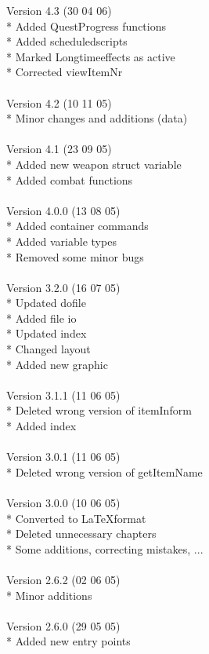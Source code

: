 \documentclass[a4paper,10pt,makeidx]{scrreprt}
\begin{document}
Version 4.3 (30 04 06)\\
* Added QuestProgress functions\\
* Added scheduledscripts\\
* Marked Longtimeeffects as active\\
* Corrected viewItemNr\\
\\
Version 4.2 (10 11 05)\\
* Minor changes and additions (data)\\
\\
Version 4.1 (23 09 05)\\
* Added new weapon struct variable\\
* Added combat functions\\
\\
Version 4.0.0 (13 08 05)\\
* Added container commands\\
* Added variable types\\
* Removed some minor bugs\\
\\
Version 3.2.0 (16 07 05)\\
* Updated dofile\\
* Added file io\\
* Updated index\\
* Changed layout\\
* Added new graphic\\
\\
Version 3.1.1 (11 06 05)\\
* Deleted wrong version of itemInform\\
* Added index\\
\\
Version 3.0.1 (11 06 05)\\
* Deleted wrong version of getItemName\\
\\
Version 3.0.0 (10 06 05)\\
* Converted to \LaTeX format\\
* Deleted unnecessary chapters\\
* Some additions, correcting mistakes, ...\\
\\
Version 2.6.2 (02 06 05)\\
* Minor additions\\
\\
Version 2.6.0 (29 05 05)\\
* Added new entry points\\
\end{document}
